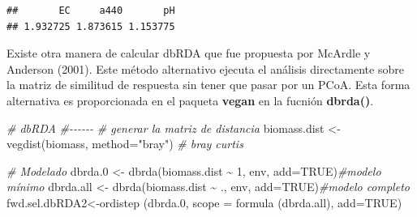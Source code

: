 \documentclass[
]{book}
\newenvironment{Shaded}{\begin{snugshade}}{\end{snugshade}}
\newcommand{\AttributeTok}[1]{\textcolor[rgb]{0.77,0.63,0.00}{#1}}
\newcommand{\CommentTok}[1]{\textcolor[rgb]{0.56,0.35,0.01}{\textit{#1}}}
\newcommand{\ConstantTok}[1]{\textcolor[rgb]{0.00,0.00,0.00}{#1}}
\newcommand{\DecValTok}[1]{\textcolor[rgb]{0.00,0.00,0.81}{#1}}
\newcommand{\FloatTok}[1]{\textcolor[rgb]{0.00,0.00,0.81}{#1}}
\newcommand{\FunctionTok}[1]{\textcolor[rgb]{0.00,0.00,0.00}{#1}}
\newcommand{\NormalTok}[1]{#1}
\newcommand{\OtherTok}[1]{\textcolor[rgb]{0.56,0.35,0.01}{#1}}
\newcommand{\SpecialCharTok}[1]{\textcolor[rgb]{0.00,0.00,0.00}{#1}}
\newcommand{\StringTok}[1]{\textcolor[rgb]{0.31,0.60,0.02}{#1}}
\begin{document}
\begin{verbatim}
##       EC     a440       pH 
## 1.932725 1.873615 1.153775
\end{verbatim}

Existe otra manera de calcular dbRDA que fue propuesta por McArdle y Anderson (2001). Este método alternativo ejecuta el análisis directamente sobre la matriz de similitud de respuesta sin tener que pasar por un PCoA. Esta forma alternativa es proporcionada en el paqueta \textbf{vegan} en la fucnión \textbf{dbrda()}.

\begin{Shaded}
\begin{Highlighting}[]
\CommentTok{\# dbRDA}
\CommentTok{\#{-}{-}{-}{-}{-}{-}}
\CommentTok{\# generar la matriz de distancia}
\NormalTok{biomass.dist }\OtherTok{\textless{}{-}} \FunctionTok{vegdist}\NormalTok{(biomass, }\AttributeTok{method=}\StringTok{"bray"}\NormalTok{) }\CommentTok{\# bray curtis}
\end{Highlighting}
\end{Shaded}

\begin{Shaded}
\begin{Highlighting}[]
\CommentTok{\# Modelado}
\NormalTok{dbrda}\FloatTok{.0} \OtherTok{\textless{}{-}} \FunctionTok{dbrda}\NormalTok{(biomass.dist }\SpecialCharTok{\textasciitilde{}} \DecValTok{1}\NormalTok{, env, }\AttributeTok{add=}\ConstantTok{TRUE}\NormalTok{)}\CommentTok{\#modelo mínimo}
\NormalTok{dbrda.all }\OtherTok{\textless{}{-}} \FunctionTok{dbrda}\NormalTok{(biomass.dist }\SpecialCharTok{\textasciitilde{}}\NormalTok{ ., env, }\AttributeTok{add=}\ConstantTok{TRUE}\NormalTok{)}\CommentTok{\#modelo completo}
\NormalTok{fwd.sel.dbRDA2}\OtherTok{\textless{}{-}}\FunctionTok{ordistep}\NormalTok{ (dbrda}\FloatTok{.0}\NormalTok{, }\AttributeTok{scope =} \FunctionTok{formula}\NormalTok{ (dbrda.all), }\AttributeTok{add=}\ConstantTok{TRUE}\NormalTok{)}
\end{Highlighting}
\end{Shaded}
\end{document}
